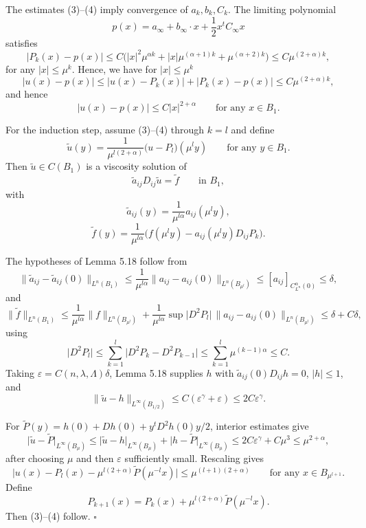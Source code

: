 The estimates (3)--(4) imply convergence of $a_k,b_k,C_k$. The limiting polynomial
\[
p(x) = a_\infty + b_\infty \cdot x + \frac{1}{2}x^t C_\infty x
\]
satisfies
\[
\lvert P_k(x) - p(x)\rvert \le C\bigl(\lvert x\rvert^2\mu^{\alpha k} + \lvert x\rvert\mu^{(\alpha+1)k} + \mu^{(\alpha+2)k}\bigr) \le C\mu^{(2+\alpha)k},
\]
for any $\lvert x\rvert \le \mu^k$. Hence, we have for $\lvert x\rvert \le \mu^k$
\[
\lvert u(x) - p(x)\rvert \le \lvert u(x)-P_k(x)\rvert + \lvert P_k(x)-p(x)\rvert \le C\mu^{(2+\alpha)k},
\]
and hence
\[
\lvert u(x)-p(x)\rvert \le C\lvert x\rvert^{2+\alpha} \qquad \text{for any } x \in B_1.
\]

For the induction step, assume (3)--(4) through $k=l$ and define
\[
\tilde{u}(y) = \frac{1}{\mu^{l(2+\alpha)}}\bigl(u - P_l\bigr)(\mu^l y) \qquad \text{for any } y \in B_1.
\]
Then $\tilde{u} \in C(B_1)$ is a viscosity solution of
\[
\tilde{a}_{ij}D_{ij}\tilde{u} = \tilde{f} \qquad \text{in } B_1,
\]
with
\[
\tilde{a}_{ij}(y) = \frac{1}{\mu^{l\alpha}}a_{ij}(\mu^l y),
\]
\[
\tilde{f}(y) = \frac{1}{\mu^{l\alpha}}\bigl(f(\mu^l y) - a_{ij}(\mu^l y)D_{ij}P_k\bigr).
\]

The hypotheses of Lemma 5.18 follow from
\[
\lVert \tilde{a}_{ij} - \tilde{a}_{ij}(0)\rVert_{L^n(B_1)} \le \frac{1}{\mu^{l\alpha}}\lVert a_{ij} - a_{ij}(0)\rVert_{L^n(B_{\mu^l})} \le [a_{ij}]_{C^\alpha_{L^n}(0)} \le \delta,
\]
and
\[
\lVert \tilde{f}\rVert_{L^n(B_1)} \le \frac{1}{\mu^{l\alpha}}\lVert f\rVert_{L^n(B_{\mu^l})} + \frac{1}{\mu^{l\alpha}}\sup \lvert D^2P_l\rvert \,\lVert a_{ij} - a_{ij}(0)\rVert_{L^n(B_{\mu^l})} \le \delta + C\delta,
\]
using
\[
\lvert D^2P_l\rvert \le \sum_{k=1}^l \lvert D^2P_k - D^2P_{k-1}\rvert \le \sum_{k=1}^l \mu^{(k-1)\alpha} \le C.
\]
Taking $\varepsilon=C(n,\lambda,\Lambda)\delta$, Lemma 5.18 supplies $h$ with $\tilde a_{ij}(0)D_{ij}h=0$, $|h|\le1$, and
\[
\lVert \tilde{u} - h\rVert_{L^\infty(B_{1/2})} \le C(\varepsilon^\gamma + \varepsilon) \le 2C\varepsilon^\gamma.
\]

For $\tilde P(y)=h(0)+Dh(0)+y^tD^2h(0)y/2$, interior estimates give
\[
\lvert \tilde{u} - \tilde{P}\rvert_{L^\infty(B_\mu)} \le \lvert \tilde{u} - h\rvert_{L^\infty(B_\mu)} + \lvert h - \tilde{P}\rvert_{L^\infty(B_\mu)} \le 2C\varepsilon^\gamma + C\mu^3 \le \mu^{2+\alpha},
\]
after choosing $\mu$ and then $\varepsilon$ sufficiently small. Rescaling gives
\[
\lvert u(x) - P_l(x) - \mu^{l(2+\alpha)}\tilde{P}(\mu^{-l}x)\rvert \le \mu^{(l+1)(2+\alpha)} \qquad \text{for any } x \in B_{\mu^{l+1}}.
\]
Define
\[
P_{k+1}(x) = P_k(x) + \mu^{l(2+\alpha)}\tilde{P}(\mu^{-l}x).
\]
Then (3)--(4) follow. $\square$

